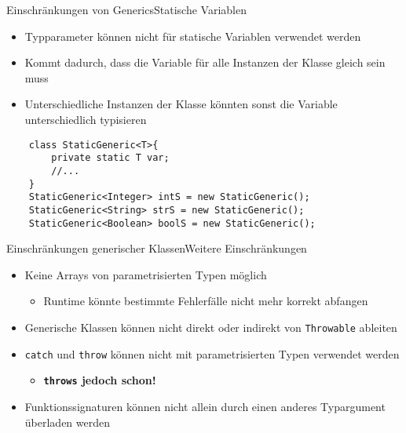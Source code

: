 \begin{frame}[fragile]{Einschränkungen von Generics}{Statische Variablen}
    \begin{itemize}
        \item Typparameter können nicht für statische Variablen verwendet werden
        \item Kommt dadurch, dass die Variable für alle Instanzen der Klasse gleich sein muss
        \item Unterschiedliche Instanzen der Klasse könnten sonst die Variable unterschiedlich typisieren
    \end{itemize}
    \lstset{style=javacode}
    \pause
    \begin{lstlisting}
    class StaticGeneric<T>{
        private static T var;
        //...
    }
    StaticGeneric<Integer> intS = new StaticGeneric();
    StaticGeneric<String> strS = new StaticGeneric();
    StaticGeneric<Boolean> boolS = new StaticGeneric();
    \end{lstlisting}
\end{frame}

\begin{frame}{Einschränkungen generischer Klassen}{Weitere Einschränkungen}
    \begin{itemize}
        \item Keine Arrays von parametrisierten Typen möglich
        \begin{itemize}
            \item Runtime könnte bestimmte Fehlerfälle nicht mehr korrekt abfangen
        \end{itemize}
        \item Generische Klassen können nicht direkt oder indirekt von \texttt{Throwable} ableiten
        \item \texttt{catch} und \texttt{throw} können nicht mit parametrisierten Typen verwendet werden
        \begin{itemize}
            \item \textbf{\texttt{throws} jedoch schon!}
        \end{itemize}
        \item Funktionssignaturen können nicht allein durch einen anderes Typargument überladen werden
    \end{itemize}
\end{frame}